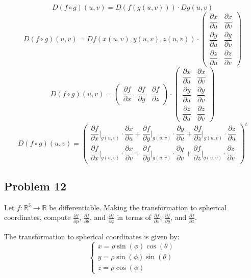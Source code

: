 \documentclass[11pt]{article}
\begin{document}
\[ D(f \circ g)(u, v) = D(f(g(u, v))) \cdot Dg(u, v) \]
\[ D(f \circ g)(u, v) = Df(x(u, v), y(u, v), z(u, v)) \cdot \begin{pmatrix}
    \dfrac{\partial x}{\partial u} & \dfrac{\partial x}{\partial v} \\
    \dfrac{\partial y}{\partial u} & \dfrac{\partial y}{\partial v} \\
    \dfrac{\partial z}{\partial u} & \dfrac{\partial z}{\partial v}
\end{pmatrix} \]
\[ D(f \circ g)(u, v) = \begin{pmatrix}
    \dfrac{\partial f}{\partial x} & \dfrac{\partial f}{\partial y} & \dfrac{\partial f}{\partial z}
\end{pmatrix} \cdot \begin{pmatrix}
    \dfrac{\partial x}{\partial u} & \dfrac{\partial x}{\partial v} \\
    \dfrac{\partial y}{\partial u} & \dfrac{\partial y}{\partial v} \\
    \dfrac{\partial z}{\partial u} & \dfrac{\partial z}{\partial v}
\end{pmatrix} \]
\[ D(f \circ g)(u, v) = \begin{pmatrix}
    \dfrac{\partial f}{\partial x} \big|_{g(u, v)} \cdot \dfrac{\partial x}{\partial u} + \dfrac{\partial f}{\partial y} \big|_{g(u, v)} \cdot \dfrac{\partial y}{\partial u} + \dfrac{\partial f}{\partial z} \big|_{g(u, v)} \cdot \dfrac{\partial z}{\partial u} \\
    \dfrac{\partial f}{\partial x} \big|_{g(u, v)} \cdot \dfrac{\partial x}{\partial v} + \dfrac{\partial f}{\partial y} \big|_{g(u, v)} \cdot \dfrac{\partial y}{\partial v} + \dfrac{\partial f}{\partial z} \big|_{g(u, v)} \cdot \dfrac{\partial z}{\partial v}
\end{pmatrix}^t \]

\subsection*{Problem 12}

Let \( f : \mathbb{R}^3 \rightarrow \mathbb{R} \) be differentiable. Making the transformation to spherical coordinates, compute \(\frac{\partial f}{\partial \rho}\), \(\frac{\partial f}{\partial \theta}\), and \(\frac{\partial f}{\partial \phi}\) in terms of \(\frac{\partial f}{\partial x}\), \(\frac{\partial f}{\partial y}\), and \(\frac{\partial f}{\partial z}\).

The transformation to spherical coordinates is given by:
\[
\begin{cases}
x = \rho \sin(\phi) \cos(\theta) \\
y = \rho \sin(\phi) \sin(\theta) \\
z = \rho \cos(\phi)
\end{cases}
\]
\end{document}
